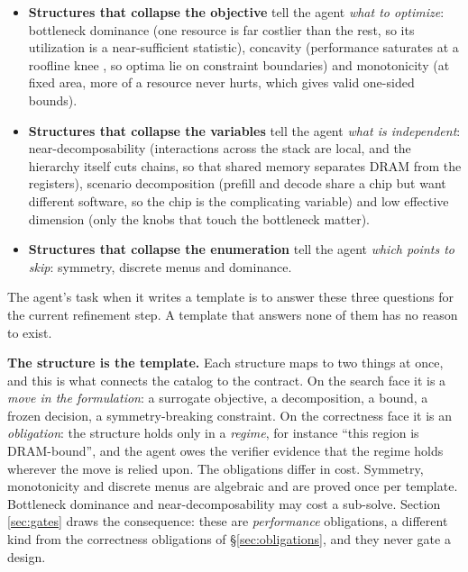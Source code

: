 \documentclass[11pt]{article}
\providecommand{\tightlist}{\setlength{\itemsep}{0pt}\setlength{\parskip}{0pt}}
\begin{document}
\begin{itemize}
\tightlist
\item \textbf{Structures that collapse the objective} tell the agent \emph{what to optimize}: bottleneck dominance (one resource is far costlier than the rest, so its utilization is a near-sufficient statistic), concavity (performance saturates at a roofline knee \cite{r102}, so optima lie on constraint boundaries) and monotonicity (at fixed area, more of a resource never hurts, which gives valid one-sided bounds).
\item \textbf{Structures that collapse the variables} tell the agent \emph{what is independent}: near-decomposability \cite{r101} (interactions across the stack are local, and the hierarchy itself cuts chains, so that shared memory separates DRAM from the registers), scenario decomposition (prefill and decode share a chip but want different software, so the chip is the complicating variable) and low effective dimension (only the knobs that touch the bottleneck matter).
\item \textbf{Structures that collapse the enumeration} tell the agent \emph{which points to skip}: symmetry, discrete menus and dominance.
\end{itemize}

The agent's task when it writes a template is to answer these three questions for the current refinement step. A template that answers none of them has no reason to exist.

\textbf{The structure is the template.} Each structure maps to two things at once, and this is what connects the catalog to the contract. On the search face it is a \emph{move in the formulation}: a surrogate objective, a decomposition, a bound, a frozen decision, a symmetry-breaking constraint. On the correctness face it is an \emph{obligation}: the structure holds only in a \emph{regime}, for instance ``this region is DRAM-bound'', and the agent owes the verifier evidence that the regime holds wherever the move is relied upon. The obligations differ in cost. Symmetry, monotonicity and discrete menus are algebraic and are proved once per template. Bottleneck dominance and near-decomposability may cost a sub-solve. Section \ref{sec:gates} draws the consequence: these are \emph{performance} obligations, a different kind from the correctness obligations of §\ref{sec:obligations}, and they never gate a design.
\end{document}
